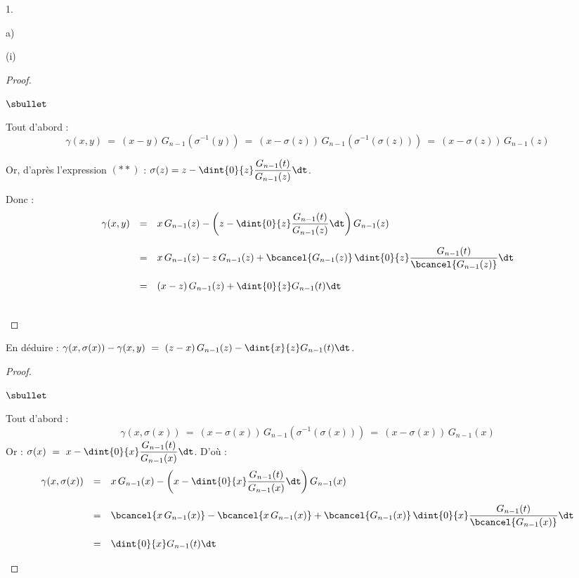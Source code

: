 \documentclass[11pt]{article}%
\begin{document}
\begin{noliste}{1.}
\begin{noliste}{a)}
\begin{nonoliste}{(i)}
      \begin{proof}~
	\begin{noliste}{$\sbullet$}
	  \item Tout d'abord :
	  \[
	    \gamma(x,y) \ = \ (x-y) \, G_{n-1}(\sigma^{-1}(y))
	    \ = \ (x- \sigma(z)) \, G_{n-1}(\sigma^{-1}(\sigma(z)))
	    \ = \ (x-\sigma(z)) \, G_{n-1}(z)
	  \]
	  
	  \item Or, d'après l'expression $(**)$ : $\sigma(z) = 
	  z - \dint{0}{z} \dfrac{G_{n-1}(t)}{G_{n-1}(z)} \dt$.
	  
	  \item Donc :
	  \[
	    \begin{array}{rcl}
	      \gamma(x,y) & = & x \, G_{n-1}(z) - \left(z - \dint{0}{z}
	      \dfrac{G_{n-1}(t)}{G_{n-1}(z)} \dt\right) G_{n-1}(z)
	      \\[.6cm]
	      & = & x \, G_{n-1}(z) - z \, G_{n-1}(z) + 
	      \bcancel{G_{n-1}(z)} \, \dint{0}{z} \dfrac{G_{n-1}(t)}
	      {\bcancel{G_{n-1}(z)}} \dt
	      \\[.6cm]
	      & = & (x-z) \, G_{n-1}(z) + \dint{0}{z} G_{n-1}(t) \dt
	    \end{array}
	  \]
	\end{noliste}
	~\\[-1cm]
      \end{proof}
      
      \item En déduire : $\gamma(x, \sigma(x)) - \gamma(x,y) \ = \
      (z-x) \, G_{n-1}(z) - \dint{x}{z} G_{n-1}(t) \dt$.
      
      \begin{proof}~
        \begin{noliste}{$\sbullet$}
	  \item Tout d'abord :
	  \[
	    \gamma(x, \sigma(x)) \ = \ (x - \sigma(x)) \, G_{n-1}(
	    \sigma^{-1}(\sigma(x))) \ = \ (x- \sigma(x)) \, G_{n-1}(x)
	  \]
	  Or : $\sigma(x) \ = \ x - \dint{0}{x} \dfrac{G_{n-1}(t)}
	  {G_{n-1}(x)} \dt$. D'où :
	  \[
	    \begin{array}{rcl}
	      \gamma(x,\sigma(x)) & = & x \, G_{n-1}(x) - \left(x - 
	      \dint{0}{x}
	      \dfrac{G_{n-1}(t)}{G_{n-1}(x)} \dt\right) G_{n-1}(x)
	      \\[.6cm]
	      & = & \bcancel{x \, G_{n-1}(x)} - \bcancel{x \, G_{n-1}(x)} 
	      + 
	      \bcancel{G_{n-1}(x)} \, \dint{0}{x} \dfrac{G_{n-1}(t)}
	      {\bcancel{G_{n-1}(x)}} \dt
	      \\[.6cm]
	      & = & \dint{0}{x} G_{n-1}(t) \dt
	    \end{array}
	  \]
	  

\end{noliste}
\end{proof}
\end{nonoliste}
\end{noliste}
\end{noliste}
\end{document}
